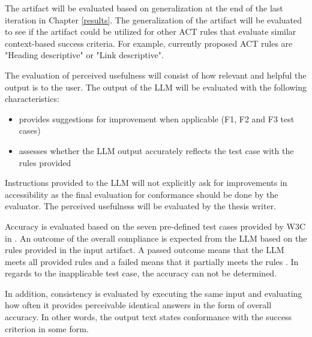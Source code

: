 The artifact will be evaluated based on generalization at the end of the last iteration in Chapter \ref{results}. The generalization of the artifact will be evaluated to see if the artifact could be utilized for other ACT rules that evaluate similar context-based success criteria. For example, currently proposed ACT rules are "Heading descriptive" or "Link descriptive".

The evaluation of perceived usefulness will consist of how relevant and helpful the output is to the user. The output of the LLM will be evaluated with the following characteristics: 

\begin{itemize}
    \item provides suggestions for improvement when applicable (F1, F2 and F3 test cases)
    \item assesses whether the LLM output accurately reflects the test case with the rules provided
\end{itemize}

Instructions provided to the LLM will not explicitly ask for improvements in accessibility as the final evaluation for conformance should be done by the evaluator. The perceived usefulness will be evaluated by the thesis writer.

Accuracy is evaluated based on the seven pre-defined test cases provided by W3C in \textcite{act_rule_g88}. An outcome of the overall compliance is expected from the LLM based on the rules provided in the input artifact. A passed outcome means that the LLM meets all provided rules and a failed means that it partially meets the rules \citep{act_rule_g88}. In regards to the inapplicable test case, the accuracy can not be determined. 

In addition, consistency is evaluated by executing the same input and evaluating how often it provides perceivable identical answers in the form of overall accuracy. In other words, the output text states conformance with the success criterion in some form. 

